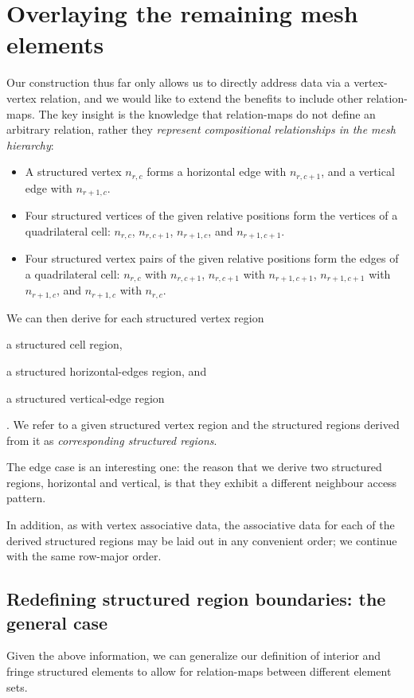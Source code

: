 \section{Overlaying the remaining mesh elements}
Our construction thus far only allows us to directly address data via a vertex-vertex relation, and we would like to extend the benefits to include other relation-maps. The key insight is the knowledge that relation-maps do not define an arbitrary relation, rather they \emph{represent compositional relationships in the mesh hierarchy}:
\begin{itemize}
\item A structured vertex $n_{r,c}$ forms a horizontal edge with $n_{r,c+1}$, and a vertical edge with $n_{r+1,c}$.
\item Four structured vertices of the given relative positions form the vertices of a quadrilateral cell: $n_{r,c}$, $n_{r,c+1}$, $n_{r+1,c}$, and $n_{r+1,c+1}$.
\item Four structured vertex pairs of the given relative positions form the edges of a quadrilateral cell: $n_{r,c}$ with $n_{r,c+1}$, $n_{r,c+1}$ with $n_{r+1,c+1}$, $n_{r+1,c+1}$ with $n_{r+1,c}$, and $n_{r+1,c}$ with $n_{r,c}$.
\end{itemize}


We can then derive for each structured vertex region
\begin{enumerate*}[label=\alph*)]
\item a structured cell region,
\item a structured horizontal-edges region, and
\item a structured vertical-edge region
\end{enumerate*}.
We refer to a given structured vertex region and the structured regions derived from it as \emph{corresponding structured regions}.

The edge case is an interesting one: the reason that we derive two structured regions, horizontal and vertical, is that they exhibit a different neighbour access pattern.


In addition, as with vertex associative data, the associative data for each of the derived structured regions may be laid out in any convenient order; we continue with the same row-major order.

\subsection{Redefining structured region boundaries: the general case}
Given the above information, we can generalize our definition of interior and fringe structured elements to allow for relation-maps between different element sets.

